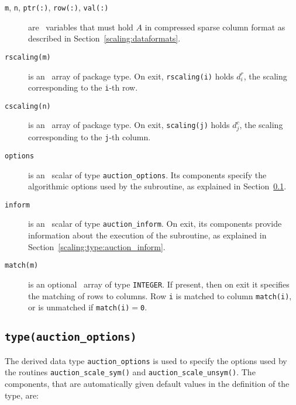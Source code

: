 \begin{description}

\item[\texttt{m}, \texttt{n}, \texttt{ptr(:)}, \texttt{row(:)}, \texttt{val(:)}] are \intentin\ variables that must hold $A$ in compressed sparse column format as described in Section~\ref{scaling:dataformats}.

\item[\texttt{rscaling(m)}] is an \intentout\ array of package type. On exit,
\texttt{rscaling(i)} holds $d^r_i$, the scaling corresponding to
the \texttt{i}-th row.

\item[\texttt{cscaling(n)}] is an \intentout\ array of package type. On exit,
\texttt{scaling(j)} holds $d^c_j$, the scaling corresponding to
the \texttt{j}-th column.

\item[\texttt{options}] is an \intentin\ scalar of type \texttt{auction\_options}. Its components specify the algorithmic options used by the subroutine, as explained in Section~\ref{scaling:type:auction_options}.

\item[\texttt{inform}] is an \intentout\ scalar of type \texttt{auction\_inform}. On exit, its components provide information about the execution of the subroutine, as explained in Section~\ref{scaling:type:auction_inform}.

\item[\texttt{match(m)}] is an optional \intentout\ array of type {\tt INTEGER}.
If present, then on exit it specifies the matching of rows to columns.
Row \texttt{i} is matched to column \texttt{match(i)}, or is unmatched
if \texttt{match(i)}$=$\texttt{0}.

\end{description}

\subsection{\texttt{type(auction\_options)}} \label{scaling:type:auction_options}

The derived data type \texttt{auction\_options} is used to specify the options
used by the routines \texttt{auction\_scale\_sym()} and \texttt{auction\_scale\_unsym()}. The components, that
are automatically given default values in the definition of the type, are:


